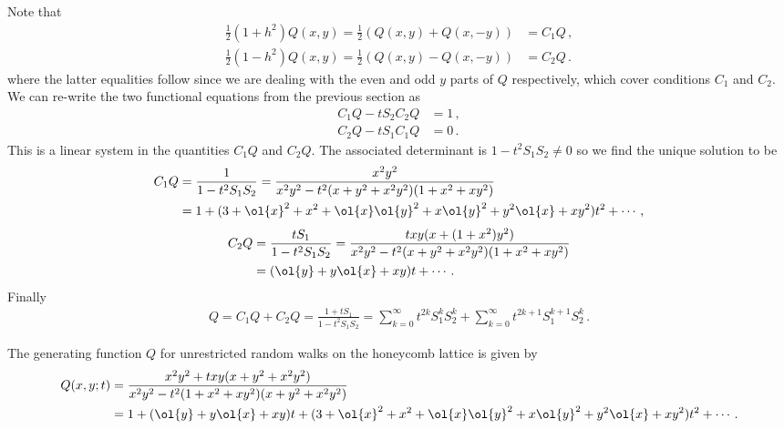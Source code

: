 Note that
\begin{align}
	\frac{1}{2}(1+h^2)Q(x,y) = \frac{1}{2}(Q(x,y)+Q(x,-y)) &= C_1 Q\,,\\
	\frac{1}{2}(1-h^2)Q(x,y) =  \frac{1}{2}(Q(x,y)-Q(x,-y)) &= C_2 Q\,.
\end{align}
where the latter equalities follow since we are dealing with the even and odd $y$ parts of $Q$ respectively, which cover conditions $C_1$ and $C_2$. We can re-write the two functional equations from the previous section as
\begin{align}
	C_1Q-tS_2C_2 Q &= 1\,,\\
	C_2Q-tS_1C_1Q &= 0\,.
\end{align}
This is a linear system in the quantities $C_1Q$ and $C_2 Q$. The associated determinant is $1-t^2S_1S_2 \neq 0$ so we find the unique solution to be
\begin{align}\begin{split}
	C_1Q &= \frac{1}{1-t^2S_1S_2} = \frac{x^2y^2}{x^2y^2-t^2(x+y^2+x^2y^2)(1+x^2+xy^2)}\\
		&= 1 + (3+\ol{x}^2+x^2+\ol{x}\ol{y}^2+x\ol{y}^2+y^2\ol{x}+xy^2)t^2 + \cdots\,,
\end{split}\end{align}
\begin{align}\begin{split}
	 C_2Q &= \frac{t S_1}{1-t^2 S_1S_2} = \frac{txy(x+(1+x^2)y^2)}{x^2y^2-t^2(x+y^2+x^2y^2)(1+x^2+xy^2)}\\
		 &= (\ol{y}+y\ol{x}+xy)t + \cdots\,.
\end{split}\end{align}
Finally
\begin{align}
	Q = C_1 Q + C_2 Q = \frac{1+tS_1}{1-t^2 S_1S_2} = \sum_{k=0}^{\infty} t^{2k} S_1^k S_2^k +\sum_{k=0}^{\infty} t^{2k+1} S_1^{k+1} S_2^k\,.
\end{align}
\begin{prop} The generating function $Q$ for unrestricted random walks on the honeycomb lattice is given by
\begin{align}\begin{split}
	Q(x,y;t) &= \frac{x^2y^2+txy(x+y^2+x^2y^2)}{x^2y^2-t^2(1+x^2+xy^2)(x+y^2+x^2y^2)}\\
		&= 1  + (\ol{y}+y\ol{x}+xy)t + (3+\ol{x}^2+x^2+\ol{x}\ol{y}^2+x\ol{y}^2+y^2\ol{x}+xy^2)t^2 + \cdots\,.
\end{split}\end{align}
\end{prop}

\endinput
